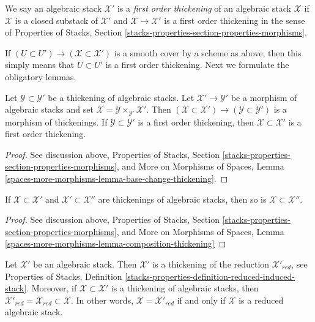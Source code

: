 \begin{definition}
\label{definition-first-order-thickening}
We say an algebraic stack $\mathcal{X}'$ is a {\it first order thickening}
of an algebraic stack $\mathcal{X}$ if $\mathcal{X}$ is a closed substack
of $\mathcal{X}'$ and $\mathcal{X} \to \mathcal{X}'$ is a first order
thickening in the sense of Properties of Stacks, Section
\ref{stacks-properties-section-properties-morphisms}.
\end{definition}

\noindent
If $(U \subset U') \to (\mathcal{X} \subset \mathcal{X}')$ is a smooth
cover by a scheme as above, then this simply means that $U \subset U'$
is a first order thickening. Next we formulate the obligatory lemmas.

\begin{lemma}
\label{lemma-base-change-thickening}
Let $\mathcal{Y} \subset \mathcal{Y}'$ be a thickening of algebraic stacks.
Let $\mathcal{X}' \to \mathcal{Y}'$ be a morphism of algebraic stacks
and set $\mathcal{X} = \mathcal{Y} \times_{\mathcal{Y}'} \mathcal{X}'$.
Then
$(\mathcal{X} \subset \mathcal{X}') \to (\mathcal{Y} \subset \mathcal{Y}')$
is a morphism of thickenings. If $\mathcal{Y} \subset \mathcal{Y}'$ is a first
order thickening, then $\mathcal{X} \subset \mathcal{X}'$ is a first
order thickening.
\end{lemma}

\begin{proof}
See discussion above, Properties of Stacks, Section
\ref{stacks-properties-section-properties-morphisms}, and
More on Morphisms of Spaces, Lemma
\ref{spaces-more-morphisms-lemma-base-change-thickening}.
\end{proof}

\begin{lemma}
\label{lemma-composition-thickening}
If $\mathcal{X} \subset \mathcal{X}'$ and $\mathcal{X}' \subset \mathcal{X}''$
are thickenings of algebraic stacks, then so is
$\mathcal{X} \subset \mathcal{X}''$.
\end{lemma}

\begin{proof}
See discussion above, Properties of Stacks, Section
\ref{stacks-properties-section-properties-morphisms}, and
More on Morphisms of Spaces, Lemma
\ref{spaces-more-morphisms-lemma-composition-thickening}
\end{proof}

\begin{example}
\label{example-reduction-thickening}
Let $\mathcal{X}'$ be an algebraic stack. Then $\mathcal{X}'$ is a thickening
of the reduction $\mathcal{X}'_{red}$, see
Properties of Stacks, Definition
\ref{stacks-properties-definition-reduced-induced-stack}.
Moreover, if $\mathcal{X} \subset \mathcal{X}'$ is a thickening
of algebraic stacks, then
$\mathcal{X}'_{red} = \mathcal{X}_{red} \subset \mathcal{X}$.
In other words, $\mathcal{X} = \mathcal{X}'_{red}$ if and only
if $\mathcal{X}$ is a reduced algebraic stack.
\end{example}

